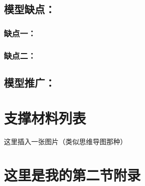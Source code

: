 \documentclass[zihao=-4,UTF8]{article}
\begin{document}
\subsection{模型缺点：}
\subsubsection{缺点一：}
\subsubsection{缺点二：}
\subsection{模型推广：}

\nocite{*}

\thispagestyle{fancy} 


\newpage
\appendix
{}
\titleformat{\subsection}{\normalsize\bfseries}{\thesubsection}{1em}{}

\section{支撑材料列表}
\begin{center}
  这里插入一张图片（类似思维导图那种）
\end{center}
\section{这里是我的第二节附录}
\end{document}
